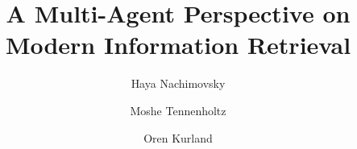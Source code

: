 \documentclass[sigconf,natbib=true,nonacm]{acmart}
\author{Haya Nachimovsky}
\affiliation{%
  \institution{Technion}
  \city{Haifa}
  \country{Israel}
  }
\author{Moshe Tennenholtz}
\affiliation{%
  \institution{Technion}
  \city{Haifa}
  \country{Israel}
  }
\author{Oren Kurland}
\affiliation{%
  \institution{Technion}
  \city{Haifa}
  \country{Israel}
  }
\title{A Multi-Agent Perspective on Modern Information Retrieval}
\begin{document}
\maketitle





















\newpage
\balance


\end{document}
